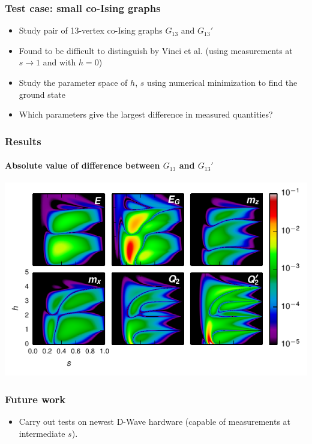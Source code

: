 \documentclass[handout]{beamer}
\begin{document}
\begin{frame}
  \frametitle{Test case: small co-Ising graphs}
  \begin{itemize}
    \item Study pair of 13-vertex co-Ising graphs $G_{13}$ and $G_{13}'$
    \item Found to be difficult to distinguish by Vinci et al. (using
      measurements at $s \rightarrow 1$ and with $h=0$)
    \item Study the parameter space of $h$, $s$ using numerical minimization to
      find the ground state
    \item Which parameters give the largest difference in measured quantities?
  \end{itemize}
\end{frame}
\begin{frame}
  \frametitle{Results}
  \framesubtitle{Absolute value of difference between $G_{13}$ and $G_{13}'$}
  \includegraphics[width=\textwidth]{delta-grid}
\end{frame}
\begin{frame}
  \frametitle{Future work}
  \begin{itemize}
    \item Carry out tests on newest D-Wave hardware (capable of measurements at
      intermediate $s$).
  \end{itemize}
\end{frame}
\end{document}
